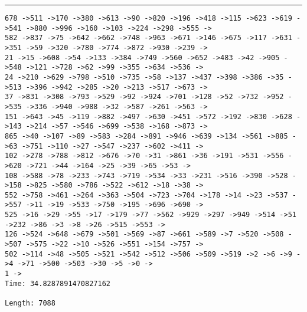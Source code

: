 \documentclass[letter, 12pt]{article}
\newenvironment{question}[1]{%
    \vspace{.2in}%
        \noindent{\bf #1}%
    \vspace{0.3em} \hrule \vspace{.1in}%
}{}
\begin{document}
\begin{question}{\large Appendix}
\begin{lstlisting}[style=CStyle]
678 ->511 ->170 ->380 ->613 ->90 ->820 ->196 ->418 ->115 ->623 ->619 ->541 ->880 ->996 ->160 ->103 ->224 ->298 ->555 ->
582 ->837 ->75 ->642 ->662 ->748 ->963 ->671 ->146 ->675 ->117 ->631 ->351 ->59 ->320 ->780 ->774 ->872 ->930 ->239 ->
21 ->15 ->608 ->54 ->133 ->384 ->749 ->560 ->652 ->483 ->42 ->905 ->548 ->121 ->728 ->62 ->99 ->355 ->634 ->536 ->
24 ->210 ->629 ->798 ->510 ->735 ->58 ->137 ->437 ->398 ->386 ->35 ->513 ->396 ->942 ->285 ->20 ->213 ->517 ->673 ->
37 ->831 ->308 ->793 ->529 ->92 ->924 ->701 ->128 ->52 ->732 ->952 ->535 ->336 ->940 ->988 ->32 ->587 ->261 ->563 ->
151 ->643 ->45 ->119 ->882 ->497 ->630 ->451 ->572 ->192 ->830 ->628 ->143 ->214 ->57 ->546 ->699 ->538 ->168 ->873 ->
865 ->40 ->107 ->89 ->583 ->284 ->891 ->946 ->639 ->134 ->561 ->885 ->63 ->751 ->110 ->27 ->547 ->237 ->602 ->411 ->
102 ->278 ->788 ->812 ->676 ->70 ->31 ->861 ->36 ->191 ->531 ->556 ->620 ->721 ->44 ->164 ->25 ->39 ->65 ->53 ->
108 ->588 ->78 ->233 ->743 ->719 ->534 ->33 ->231 ->516 ->390 ->528 ->158 ->825 ->580 ->786 ->522 ->612 ->18 ->38 ->
552 ->758 ->461 ->264 ->363 ->504 ->723 ->704 ->178 ->14 ->23 ->537 ->557 ->11 ->19 ->533 ->750 ->195 ->696 ->690 ->
525 ->16 ->29 ->55 ->17 ->179 ->77 ->562 ->929 ->297 ->949 ->514 ->51 ->232 ->86 ->3 ->8 ->26 ->515 ->553 ->
126 ->524 ->648 ->679 ->501 ->569 ->87 ->661 ->589 ->7 ->520 ->508 ->507 ->575 ->22 ->10 ->526 ->551 ->154 ->757 ->
502 ->114 ->48 ->505 ->521 ->542 ->512 ->506 ->509 ->519 ->2 ->6 ->9 ->4 ->71 ->500 ->503 ->30 ->5 ->0 ->
1 ->
Time: 34.8287891470827162

Length: 7088


\end{lstlisting}
\end{question}
\end{document}
